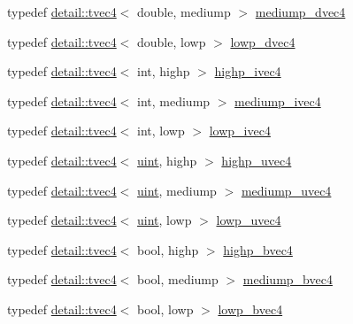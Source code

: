 \begin{DoxyCompactItemize}
\item 
typedef \hyperlink{structglm_1_1detail_1_1tvec4}{detail\+::tvec4}$<$ double, mediump $>$ \hyperlink{group__core__precision_gac61cf2fc2df895e5f277c978dace042a}{mediump\+\_\+dvec4}
\item 
typedef \hyperlink{structglm_1_1detail_1_1tvec4}{detail\+::tvec4}$<$ double, lowp $>$ \hyperlink{group__core__precision_gad04432e5d5accf764e10c6674e5d0c96}{lowp\+\_\+dvec4}
\item 
typedef \hyperlink{structglm_1_1detail_1_1tvec4}{detail\+::tvec4}$<$ int, highp $>$ \hyperlink{group__core__precision_gaeba08fcf78aeae954c3335d73500ff8b}{highp\+\_\+ivec4}
\item 
typedef \hyperlink{structglm_1_1detail_1_1tvec4}{detail\+::tvec4}$<$ int, mediump $>$ \hyperlink{group__core__precision_gaa4c23a132d76436e041747b0c03265ad}{mediump\+\_\+ivec4}
\item 
typedef \hyperlink{structglm_1_1detail_1_1tvec4}{detail\+::tvec4}$<$ int, lowp $>$ \hyperlink{group__core__precision_gab9b404ae623385d5094499d2d4e4616d}{lowp\+\_\+ivec4}
\item 
typedef \hyperlink{structglm_1_1detail_1_1tvec4}{detail\+::tvec4}$<$ \hyperlink{group__core__precision_ga4fd29415871152bfb5abd588334147c8}{uint}, highp $>$ \hyperlink{group__core__precision_ga7cb8cc501f7e680e1889b93eb80e6c46}{highp\+\_\+uvec4}
\item 
typedef \hyperlink{structglm_1_1detail_1_1tvec4}{detail\+::tvec4}$<$ \hyperlink{group__core__precision_ga4fd29415871152bfb5abd588334147c8}{uint}, mediump $>$ \hyperlink{group__core__precision_gad90c29c2643136a9bcb1165eac47c810}{mediump\+\_\+uvec4}
\item 
typedef \hyperlink{structglm_1_1detail_1_1tvec4}{detail\+::tvec4}$<$ \hyperlink{group__core__precision_ga4fd29415871152bfb5abd588334147c8}{uint}, lowp $>$ \hyperlink{group__core__precision_ga17b5f652e5c64b0034065420d844fca7}{lowp\+\_\+uvec4}
\item 
typedef \hyperlink{structglm_1_1detail_1_1tvec4}{detail\+::tvec4}$<$ bool, highp $>$ \hyperlink{group__core__precision_ga381539af52c5e5c659700e12fb706eaf}{highp\+\_\+bvec4}
\item 
typedef \hyperlink{structglm_1_1detail_1_1tvec4}{detail\+::tvec4}$<$ bool, mediump $>$ \hyperlink{group__core__precision_ga8bb7cfe902e2cb356450d211ca4d58e2}{mediump\+\_\+bvec4}
\item 
typedef \hyperlink{structglm_1_1detail_1_1tvec4}{detail\+::tvec4}$<$ bool, lowp $>$ \hyperlink{group__core__precision_ga24c651dc8cb20779b3773428aef4f7f4}{lowp\+\_\+bvec4}

\end{DoxyCompactItemize}
